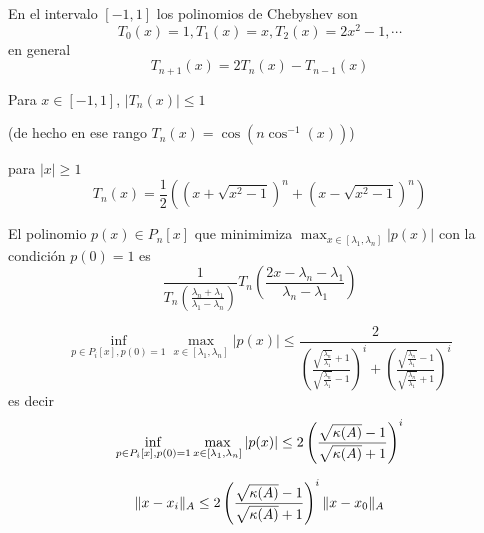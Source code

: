 En el intervalo $[-1,1]$ los polinomios de Chebyshev son
$$
T_0(x)=1,T_1(x)=x,T_2(x)=2x^2-1,\cdots 
$$
en general
$$
T_{n+1}(x)=2T_{n}(x)-T_{n-1}(x)
$$

Para $x\in [-1,1]$, $|T_n(x)|\le 1$ 

(de hecho 
en ese rango $T_n(x)=\cos(n\cos^{-1}(x))$)

para $|x|\ge 1$
$$
T_n(x)=\frac12\left((x+\sqrt{x^2-1})^n+ (x-\sqrt{x^2-1})^n\right)
$$


El polinomio $p(x)\in P_n[x]$ que minimimiza $\max_{x\in [\lambda_1,\lambda_n]}|p(x)|$ con la condición $p(0)=1$ es
$$
\frac{1}{T_n(\frac{\lambda_n+\lambda_1}{\lambda_1-\lambda_n})}T_n\left(\frac{2x-\lambda_n-\lambda_1}{\lambda_n-\lambda_1}\right)$$


$$
\inf_{p\in P_i[x],p(0)=1}\max_{x\in [\lambda_1,\lambda_n]}|p(x)|
\le \frac{2}{\left( \frac{\sqrt{\frac{\lambda_n}{\lambda_1}}+1}{\sqrt{\frac{\lambda_n}{\lambda_1}}-1}\right)^i+\left( \frac{\sqrt{\frac{\lambda_n}{\lambda_1}}-1}{\sqrt{\frac{\lambda_n}{\lambda_1}}+1}\right)^i}$$ 
es decir
$$
\inf_{p\in P_i[x],p(0)=1}\max_{x\in [\lambda_1,\lambda_n]}|p(x)|
\le 2\left(\frac{\sqrt{\kappa(\Ab)}-1}{\sqrt{\kappa(\Ab)}+1}\right)^i
$$
 
$$\|\xb-\xb_i\|_{A}\le 2\left(\frac{\sqrt{\kappa(\Ab)}-1}{\sqrt{\kappa(\Ab)}+1}\right)^i\|\xb-\xb_0\|_{A}$$

 
